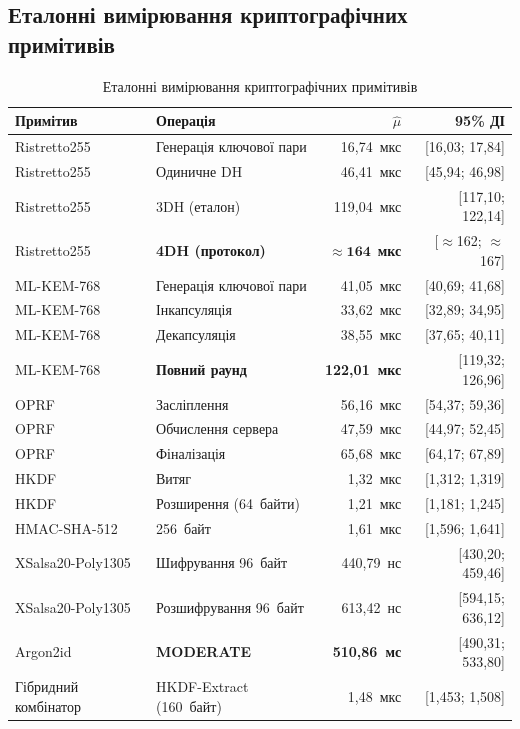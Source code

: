 \documentclass{llncs}
\begin{document}
\subsection{Еталонні вимірювання криптографічних примітивів}

\begin{table}[htbp]
\caption{Еталонні вимірювання криптографічних примітивів}
\label{tab:micro-bench}
\centering\small
\begin{tabular*}{\textwidth}{@{\extracolsep{\fill}}llrr@{}}
\toprule
Примітив & Операція & $\hat{\mu}$ & 95\% ДІ \\
\midrule
Ristretto255 & Генерація ключової пари & 16,74~мкс & [16,03; 17,84] \\
Ristretto255 & Одиничне DH & 46,41~мкс & [45,94; 46,98] \\
Ristretto255 & 3DH (еталон) & 119,04~мкс & [117,10; 122,14] \\
Ristretto255 & \textbf{4DH (протокол)} & $\approx\mathbf{164}$~\textbf{мкс} & [$\approx$162; $\approx$167] \\
ML-KEM-768 & Генерація ключової пари & 41,05~мкс & [40,69; 41,68] \\
ML-KEM-768 & Інкапсуляція & 33,62~мкс & [32,89; 34,95] \\
ML-KEM-768 & Декапсуляція & 38,55~мкс & [37,65; 40,11] \\
ML-KEM-768 & \textbf{Повний раунд} & \textbf{122,01~мкс} & [119,32; 126,96] \\
OPRF & Засліплення & 56,16~мкс & [54,37; 59,36] \\
OPRF & Обчислення сервера & 47,59~мкс & [44,97; 52,45] \\
OPRF & Фіналізація & 65,68~мкс & [64,17; 67,89] \\
HKDF & Витяг & 1,32~мкс & [1,312; 1,319] \\
HKDF & Розширення (64~байти) & 1,21~мкс & [1,181; 1,245] \\
HMAC-SHA-512 & 256~байт & 1,61~мкс & [1,596; 1,641] \\
XSalsa20-Poly1305 & Шифрування 96~байт & 440,79~нс & [430,20; 459,46] \\
XSalsa20-Poly1305 & Розшифрування 96~байт & 613,42~нс & [594,15; 636,12] \\
Argon2id & \textbf{MODERATE} & \textbf{510,86~мс} & [490,31; 533,80] \\
Гібридний комбінатор & HKDF-Extract (160~байт) & 1,48~мкс & [1,453; 1,508] \\
\bottomrule
\end{tabular*}
\end{table}
\end{document}
